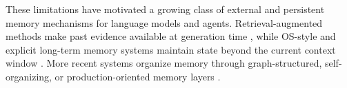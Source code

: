 \documentclass{article}
\theoremstyle{plain}
\theoremstyle{definition}
\theoremstyle{remark}
\begin{document}
These limitations have motivated a growing class of external and persistent
memory mechanisms for language models and agents. Retrieval-augmented methods
make past evidence available at generation time
\citep{lewis2021retrievalaugmentedgenerationknowledgeintensivenlp}, while
OS-style and explicit long-term memory systems maintain state beyond the
current context window
\citep{packer2024memgptllmsoperatingsystems,NEURIPS2023_ebd82705}.
More recent systems organize memory through graph-structured, self-organizing,
or production-oriented memory layers
\citep{gutiérrez2025hipporagneurobiologicallyinspiredlongterm,
chhikara2025mem0buildingproductionreadyai,
nan2025nemoriselforganizingagentmemory,latimer2025hindsight2020buildingagent}.
\end{document}
